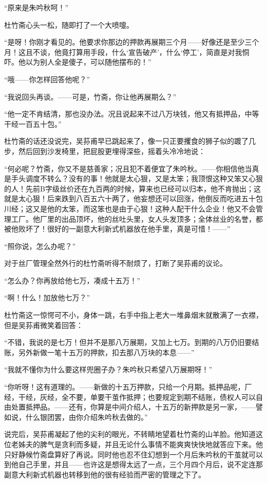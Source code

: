 \par “原来是朱吟秋呵！”
\par 杜竹斋心头一松，随即打了一个大喷嚏。
\par “是呀！你刚才看见的。他要求你那边的押款再展期三个月——好像还是至少三个月！这且不谈，他竟打算用手段，什么‘宣告破产’，什么‘停工’，简直是对我恫吓。他以为别人全是傻子，可以随他摆布的！”
\par “哦——你怎样回答他呢？”
\par “我说回头再谈。——可是，竹斋，你让他再展期么？”
\par “他一定不肯结清，那也没办法。况且说起来不过八万块钱，他又有抵押品，中等干经一百五十包。”
\par 杜竹斋的话还没说完，吴荪甫早已跳起来了，像一只正要攫食的狮子似的踱了几步，然后回到沙发椅里，把屁股更埋得深些，摇着头冷冷地说：
\par “何必呢？竹斋，你又不是慈善家；况且犯不着便宜了朱吟秋。——你相信他当真是手头调度不转么？没有的事！他就是太心狠，又是太笨；我顶恨这种又笨又心狠的人！先前B字级丝价还在九百两的时候，算来也已经可以归本，他不肯抛出；这就是太心狠！后来跌到八百五六十两了，他妄想还可以回涨，他倒反而吃进五十包川经；这又是他的太笨，而这笨也是由于心狠！这种人配干什么企业！他又不会管理工厂。他厂里的出品顶坏，他的丝吐头里，女人头发顶多；全体丝业的名誉，都被他败坏了！很好的一副意大利新式机器放在他手里，真是可惜！——”
\par “照你说，怎么办呢？”
\par 对于丝厂管理全然外行的杜竹斋听得不耐烦了，打断了吴荪甫的议论。
\par “怎么办？你再放给他七万，凑成十五万！”
\par “啊！什么！加放他七万？”
\par 杜竹斋这一惊愕可不小，身体一跳，右手中指上老大一堆鼻烟末就散满了一衣襟，但是吴荪甫微笑着回答：
\par “不错，我说的是七万！但并不是那八万展期，又加上七万。到期的八万仍旧要结账，另外新做一笔十五万的押款，扣去那八万块的本息——”
\par “我就不懂你为什么要这样兜圈子办？朱吟秋只希望八万展期呀！”
\par “你听呀！这有道理的。——新做的十五万押款，只给一个月期。抵押品呢，厂经，干经，灰经，全不要，单要干茧作抵押；也要规定到期不结账，债权人可以自由处置抵押品。——还有，你算是中间介绍人，十五万的新押款是另一家，——譬如说，什么银团罢，由你介绍朱吟秋去做的。”
\par 说完后，吴荪甫凝起了他的尖利的眼光，不转睛地望着杜竹斋的山羊脸。他知道这位老姊夫的脾气是贪利而多疑，并且无论什么事情不能爽爽快快地就答应下来。他只好静候竹斋盘算好了再说。同时他也忍不住幻想到一个月后朱吟秋的干茧就可以到他自己手里，并且——也许这是想得太远了一点，三个月四个月后，说不定连那副意大利新式机器也转移到他的很有经验而严密的管理之下了。
